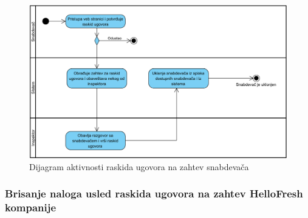 \begin{figure}[H]
\begin{center}
\includegraphics[width=\textwidth]{Pictures/activity_supplier_contract_termination_1.png}
\end{center}
    \caption{Dijagram aktivnosti raskida ugovora na zahtev snabdevača}
\label{fig:ActivitySupplierContractTermination1}
\end{figure}

\subsubsection{Brisanje naloga usled raskida ugovora na zahtev HelloFresh kompanije}

